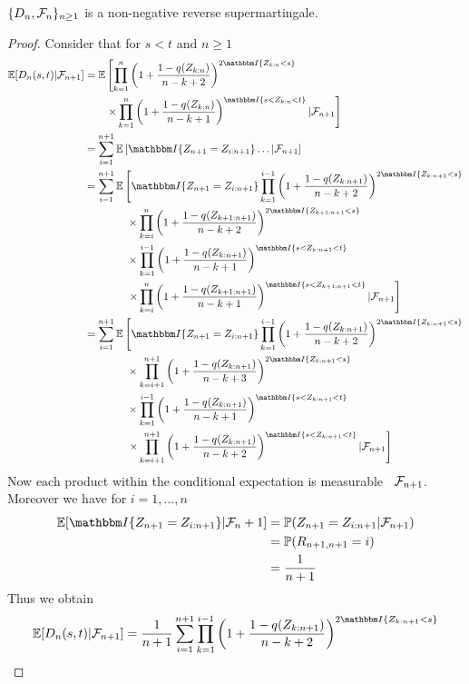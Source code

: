 \begin{lemma}
	$\{D_n, \mathcal{F}_n\}_{n\geq 1}$ is a non-negative reverse supermartingale.
	\label{lem:dn_supermart}
	\begin{proof}
		Consider that for $s<t$ and $n\geq 1$
		\begin{align*}
			\E[D_n(s,t)| \F_{n+1}] &= \E\left[\prod_{k=1}^{n}\left(1+\frac{1-q(Z_{k:n})}{n-k+2}\right)^{2\I{Z_{k:n} <s}}\right.\\
			&\qquad \left. \times \prod_{k=1}^{n}\left(1+\frac{1-q(Z_{k:n})}{n-k+1}\right)^\I{s < Z_{k:n} < t} | \F_{n+1}\right]\\
			&= \sum_{i=1}^{n+1}\E\left[\I{Z_{n+1} = Z_{i:n+1}} \dots | \F_{n+1}\right]\\
			&= \sum_{i=1}^{n+1}\E\left[\I{Z_{n+1} = Z_{i:n+1}} \prod_{k=1}^{i-1}\left(1+\frac{1-q(Z_{k:n+1})}{n-k+2}\right)^{2\I{Z_{k:n+1} <s}} \right.\\
			&\qquad\qquad \times \prod_{k=i}^{n}\left(1+\frac{1-q(Z_{k+1:n+1})}{n-k+2}\right)^{2\I{Z_{k+1:n+1} <s}}\\
			&\qquad\qquad \times \prod_{k=1}^{i-1}\left(1+\frac{1-q(Z_{k:n+1})}{n-k+1}\right)^\I{s < Z_{k:n+1} < t}\\
			&\qquad\qquad \left. \times \prod_{k=i}^{n}\left(1+\frac{1-q(Z_{k+1:n+1})}{n-k+1}\right)^\I{s < Z_{k+1:n+1} < t}| \F_{n+1}\right]\\
			&= \sum_{i=1}^{n+1}\E\left[\I{Z_{n+1} = Z_{i:n+1}} \prod_{k=1}^{i-1}\left(1+\frac{1-q(Z_{k:n+1})}{n-k+2}\right)^{2\I{Z_{k:n+1} <s}} \right.\\
			&\qquad\qquad \times \prod_{k=i+1}^{n+1}\left(1+\frac{1-q(Z_{k:n+1})}{n-k+3}\right)^{2\I{Z_{k:n+1} <s}}\\
			&\qquad\qquad \times \prod_{k=1}^{i-1}\left(1+\frac{1-q(Z_{k:n+1})}{n-k+1}\right)^\I{s < Z_{k:n+1} < t}\\
			&\qquad\qquad \left. \times \prod_{k=i+1}^{n+1}\left(1+\frac{1-q(Z_{k:n+1})}{n-k+2}\right)^\I{s < Z_{k:n+1} < t}| \F_{n+1}\right]
	\end{align*}
	Now each product within the conditional expectation is measurable \wrt\ $\mathcal{F}_{n+1}$. Moreover we have for $i=1,\dots,n$ 
	\begin{align*}
		\E[\I{Z_{n+1}=Z_{i:n+1}}|\F_n+1] &= \P(Z_{n+1}=Z_{i:n+1}|\F_{n+1})\\
		&= \P(R_{n+1,n+1} = i)\\
		&= \frac{1}{n+1}
	\end{align*}
	Thus we obtain
	\begin{align*}
			\E[D_n(s,t)| \F_{n+1}] &= \frac{1}{n+1} \sum_{i=1}^{n+1} \prod_{k=1}^{i-1}\left(1+\frac{1-q(Z_{k:n+1})}{n-k+2}\right)^{2\I{Z_{k:n+1} <s}}\\

\end{align*}
\end{proof}
\end{lemma}
